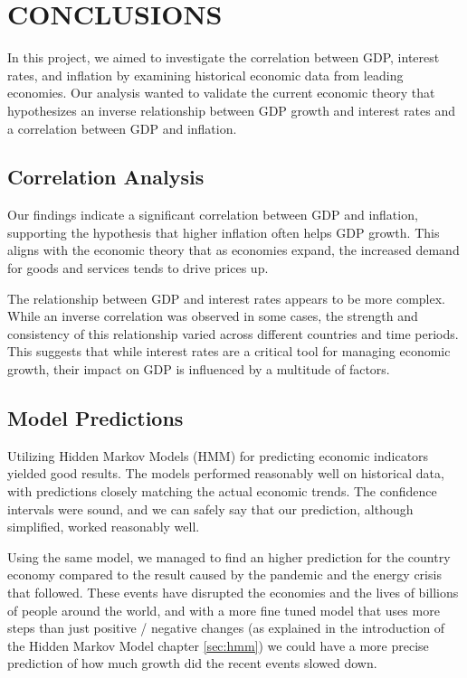 \section{CONCLUSIONS}

In this project, we aimed to investigate the correlation between GDP, interest rates, and inflation by examining historical economic data from leading economies. Our analysis wanted to validate the current economic theory that hypothesizes an inverse relationship between GDP growth and interest rates and a correlation between GDP and inflation.

\subsection*{Correlation Analysis}
Our findings indicate a significant correlation between GDP and inflation, supporting the hypothesis that higher inflation often helps GDP growth. This aligns with the economic theory that as economies expand, the increased demand for goods and services tends to drive prices up.

The relationship between GDP and interest rates appears to be more complex. While an inverse correlation was observed in some cases, the strength and consistency of this relationship varied across different countries and time periods. This suggests that while interest rates are a critical tool for managing economic growth, their impact on GDP is influenced by a multitude of factors.

\subsection*{Model Predictions}
Utilizing Hidden Markov Models (HMM) for predicting economic indicators yielded good results. The models performed reasonably well on historical data, with predictions closely matching the actual economic trends. The confidence intervals were sound, and we can safely say that our prediction, although simplified, worked reasonably well.

Using the same model, we managed to find an higher prediction for the country economy compared to the result caused by the pandemic and the energy crisis that followed. These events have disrupted the economies and the lives of billions of people around the world, and with a more fine tuned model that uses more steps than just positive / negative changes (as explained in the introduction of the Hidden Markov Model chapter \ref{sec:hmm}) we could have a more precise prediction of how much growth did the recent events slowed down.

